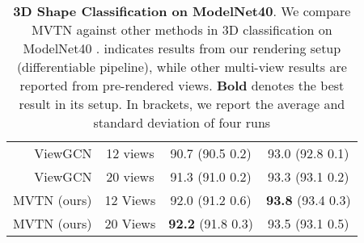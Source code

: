 \documentclass[10pt,twocolumn,letterpaper]{article}
\begin{document}
\begin{table*}[t]
{\begin{tabular}{rccc}
\midrule
ViewGCN \cite{mvviewgcn}& 12 views &    90.7 (90.5  0.2)   &93.0 (92.8  0.1) \\
ViewGCN \cite{mvviewgcn}& 20 views &    91.3 (91.0  0.2)   &93.3 (93.1  0.2) \\
MVTN (ours)  & 12 Views       & 92.0 (91.2  0.6) & \textbf{93.8} (93.4  0.3) \\
MVTN (ours)  & 20 Views       & \textbf{92.2} (91.8  0.3) & 93.5 (93.1  0.5) \\
\bottomrule
\end{tabular}
}
\vspace{2pt}
    \caption{\textbf{3D Shape Classification on ModelNet40}. We compare MVTN against other methods in 3D classification on ModelNet40 \cite{modelnet}.  indicates results from our rendering setup (differentiable pipeline), while other multi-view results are reported from pre-rendered views. \textbf{Bold} denotes the best result in its setup. In brackets, we report the average and standard deviation of four runs}
    \label{tab:ModelNet40-cls-supp}
\end{table*}
\end{document}
